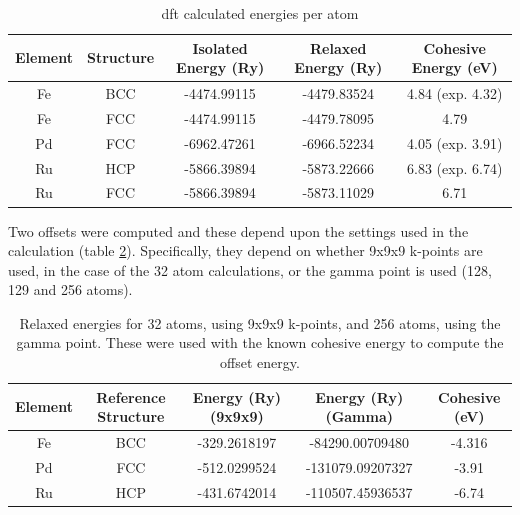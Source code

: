 \begin{table}[h]
\begin{center}
\begin{tabular}{c c c c c}
\hline\hline
Element & Structure & Isolated Energy (Ry) & Relaxed Energy (Ry) & Cohesive Energy (eV) \\
\hline\hline
Fe      & BCC       & -4474.99115          & -4479.83524         & 4.84 (exp. 4.32)\\
Fe      & FCC       & -4474.99115          & -4479.78095         & 4.79 \\
Pd      & FCC       & -6962.47261          & -6966.52234         & 4.05 (exp. 3.91)\\
Ru      & HCP       & -5866.39894          & -5873.22666         & 6.83 (exp. 6.74)\\
Ru      & FCC       & -5866.39894          & -5873.11029         & 6.71 \\
\hline\hline
\end{tabular}
\end{center}
\caption{\acrshort{dft} calculated energies per atom}
\label{table:calculatedcohesiveenergies}
\end{table}

Two offsets were computed and these depend upon the settings used in the calculation (table \ref{table:calculatedoffset}).  Specifically, they depend on whether 9x9x9 k-points are used, in the case of the 32 atom calculations, or the gamma point is used (128, 129 and 256 atoms).

\begin{table}[h]
\begin{center}
\begin{tabular}{c c c c c}
\hline\hline
Element & Reference Structure & Energy (Ry) (9x9x9) & Energy (Ry) (Gamma) & Cohesive (eV)\\
\hline\hline
Fe      & BCC  & -329.2618197  & -84290.00709480 & -4.316 \\
Pd      & FCC  & -512.0299524  & -131079.09207327 & -3.91 \\
Ru      & HCP  & -431.6742014  & -110507.45936537 & -6.74 \\
\hline\hline
\end{tabular}
\end{center}
\caption{Relaxed energies for 32 atoms, using 9x9x9 k-points, and 256 atoms, using the gamma point.  These were used with the known cohesive energy to compute the offset energy.}
\label{table:calculatedoffset}
\end{table}





